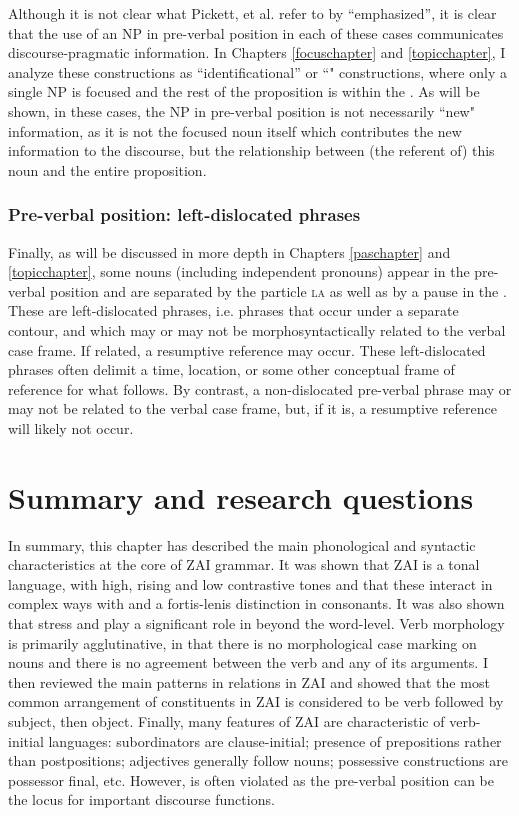 Although it is not clear what Pickett, et al. refer to by ``emphasized'', it is clear that the use of an NP in pre-verbal position in each of these cases communicates discourse-pragmatic information. In Chapters \ref{focuschapter} and \ref{topicchapter}, I analyze these constructions as ``identificational'' or ``" constructions, where only a single NP is focused and the rest of the proposition is within the  \citep[228-233]{lambrecht1994}. As will be shown, in these cases, the NP in pre-verbal position is not necessarily ``new" information, as it is not the focused noun itself which contributes the new information to the discourse, but the relationship between (the referent of) this noun and the entire proposition.  


\subsubsection{Pre-verbal position: left-dislocated phrases}
Finally, as will be discussed in more depth in Chapters \ref{paschapter} and \ref{topicchapter}, some nouns (including independent pronouns) appear in the pre-verbal position and are separated by the particle \textsc{la} as well as by a pause in the . These are left-dislocated phrases, i.e. phrases that occur under a separate  contour, and which may or may not be morphosyntactically related to the verbal case frame. If related, a resumptive reference may occur. These left-dislocated phrases often delimit a time, location, or some other conceptual frame of reference for what follows. By contrast, a non-dislocated pre-verbal phrase may or may not be related to the verbal case frame, but, if it is, a resumptive reference will likely not occur. 


\section{Summary and research questions}

In summary, this chapter has described the main phonological and syntactic characteristics at the core of ZAI grammar. It was shown that ZAI is a tonal language, with high, rising and low contrastive tones and that these interact in complex ways with  and a fortis-lenis distinction in consonants. It was also shown that stress and  play a significant role in  beyond the word-level. Verb morphology is primarily agglutinative, in that there is no morphological case marking on nouns and there is no agreement between the verb and any of its arguments. I then reviewed the main patterns in  relations in ZAI and showed that the most common arrangement of constituents in ZAI is considered to be verb followed by subject, then object. Finally, many features of ZAI are characteristic of verb-initial languages:  subordinators are clause-initial; presence of prepositions rather than postpositions; adjectives generally follow nouns; possessive constructions are possessor final, etc. However,  is often violated as the pre-verbal position can be the locus for important discourse functions.

